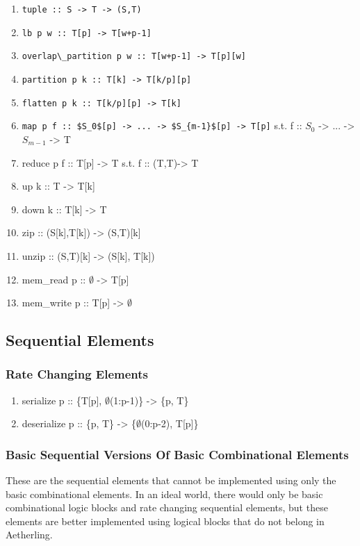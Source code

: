 \documentclass[11pt,fleqn]{article}
\numberwithin{equation}{subsection}
\begin{document}
\begin{enumerate}
    \item \lstinline!tuple :: S -> T -> (S,T)!
    \item \lstinline!lb p w :: T[p] -> T[w+p-1]!
    \item \lstinline!overlap\_partition p w :: T[w+p-1] -> T[p][w]!
    \item \lstinline!partition p k :: T[k] -> T[k/p][p]!
    \item \lstinline!flatten p k :: T[k/p][p] -> T[k]!
    \item \lstinline!map p f :: $S_0$[p] -> ... -> $S_{m-1}$[p] -> T[p]!
        \subitem s.t. f :: $S_0$ -> ... -> $S_{m-1}$ -> T 
    \item reduce p f :: T[p] -> T
        \subitem s.t. f :: (T,T)-> T
    \item up k :: T -> T[k]
    \item down k :: T[k] -> T
    \item zip :: (S[k],T[k]) -> (S,T)[k]
    \item unzip :: (S,T)[k] -> (S[k], T[k])
    \item mem\_read p :: $\emptyset$ -> T[p]
    \item mem\_write p :: T[p] -> $\emptyset$
\end{enumerate}

\subsection{Sequential Elements}

\subsubsection{Rate Changing Elements}

\begin{enumerate}
    \item serialize p :: \{T[p], $\emptyset$(1:p-1)\} -> \{p, T\}
    \item deserialize p :: \{p, T\} -> \{$\emptyset$(0:p-2), T[p]\}
\end{enumerate}

\subsubsection{Basic Sequential Versions Of Basic Combinational Elements}
These are the sequential elements that cannot be implemented using only the basic
combinational elements. In an ideal world, there would only be basic
combinational logic blocks and rate changing sequential elements, but these
elements are better implemented using logical blocks that do not belong in
Aetherling.
\end{document}
